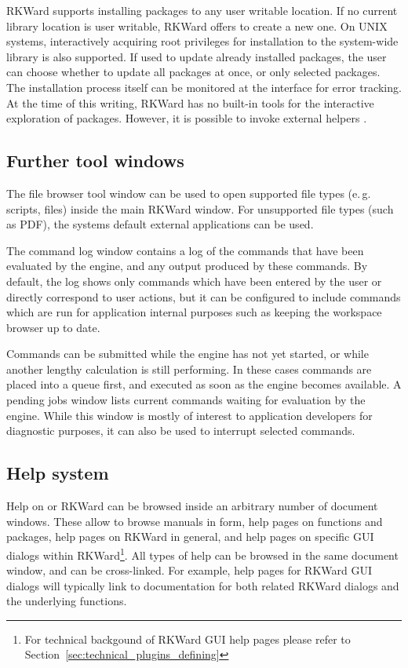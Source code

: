 RKWard supports installing packages to any user writable location. If no current
library location is user writable, RKWard offers to create a new one.
On UNIX systems, interactively acquiring root privileges for
installation to the system-wide library is also supported. If used to
update already installed packages, the user can choose whether to
update all packages at once, or only selected packages. The installation process
itself can be monitored at the interface for error tracking. At the time of this writing, RKWard has no
built-in tools for the interactive exploration of  packages. However, it is
possible to invoke external helpers \citep{Zhang2004}.

\subsection{Further tool windows}
\label{sec:further_tool_windows}

The file browser tool window can be
used to open supported file types (e.\,g. 
scripts,  files) inside the main RKWard
window. For unsupported file types (such as PDF), the
systems default external applications can be used.

The command log window contains a log of the commands that have been
evaluated by the  engine, and any output
produced by these commands. By default, the log shows only commands
which have been entered by the user or directly correspond to user
actions, but it can be configured to include commands which are run for
application internal purposes such as keeping the workspace browser up
to date.

Commands can be submitted while the  engine
has not yet started, or while another lengthy calculation is still
performing. In these cases commands are placed into a queue first, and
executed as soon as the  engine becomes
available. A pending jobs window lists current  commands waiting for
evaluation by the  engine. While this
window is mostly of interest to application developers for diagnostic
purposes, it can also be used to interrupt selected commands.

\subsection{Help system}
\label{sec:help_system}
Help on 
or RKWard can be browsed inside an arbitrary number of document
windows. These allow to browse  manuals in
 form, help pages on
 functions and packages, help pages on
RKWard in general, and help pages on specific GUI dialogs within
RKWard\footnote{For technical backgound of RKWard GUI help pages 
please refer to Section~\ref{sec:technical_plugins_defining}}. 
All types of help can be browsed in the
same document window, and can be cross-linked. For example, help pages for
RKWard GUI dialogs will typically link to documentation for both
related RKWard dialogs and the underlying
 functions.

